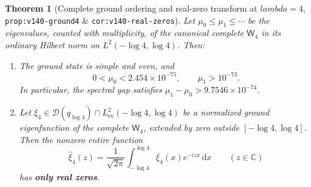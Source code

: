 \documentclass[11pt]{article}
\def\lambda{lambda}%
\newtheorem{theorem}{Theorem}[section]
\theoremstyle{remark}
\newcommand{\dd}{\mathrm d}
\begin{document}
\begin{theorem}[Complete ground ordering and real-zero transform at $\lambda = 4$, \texttt{prop:v140-ground4} \& \texttt{cor:v140-real-zeros}]
\label{thm:lambda4-ground}
Let $\mu_0 \le \mu_1 \le \cdots$ be the eigenvalues, counted with multiplicity, of the canonical complete $\mathsf{W}_4$ in its ordinary Hilbert norm on $L^2(-\log 4, \log 4)$. Then:
\begin{enumerate}[label=(\roman*)]
  \item The ground state is simple and even, and
  \begin{equation}\label{eq:v140-ground4-bounds}
    0 < \mu_0 < 2.454 \times 10^{-75}, \qquad \mu_1 > 10^{-73}.
  \end{equation}
  In particular, the spectral gap satisfies $\mu_1 - \mu_0 > 9.7546 \times 10^{-74}$.
  \item Let $\xi_4 \in \mathcal{D}(q_{\log 4}) \cap L^2_{\mathrm{ev}}(-\log 4, \log 4)$ be a normalized ground eigenfunction of the complete $\mathsf{W}_4$, extended by zero outside $[-\log 4, \log 4]$. Then the nonzero entire function
  \begin{equation}
    \widehat{\xi}_4(z) = \frac{1}{\sqrt{2\pi}}\int_{-\log 4}^{\log 4} \xi_4(x)e^{-izx}\,\dd x \qquad (z \in \mathbb{C})
  \end{equation}
  has \textbf{only real zeros}.
\end{enumerate}
\end{theorem}
\end{document}
